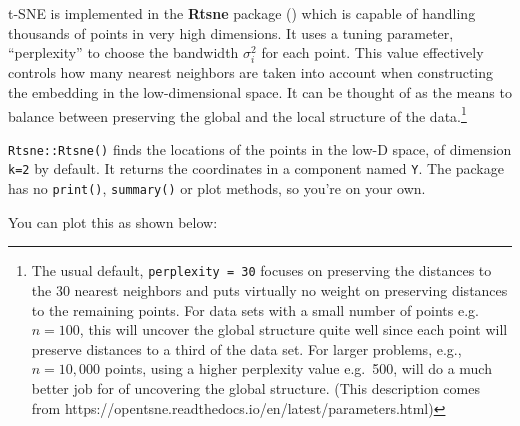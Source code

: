 \documentclass[
  letterpaper,
  10pt,
  krantz2]{krantz}
\makeatletter
\newenvironment{Shaded}{\begin{snugshade}}{\end{snugshade}}
\newcommand{\AttributeTok}[1]{\textcolor[rgb]{0.40,0.45,0.13}{#1}}
\newcommand{\ConstantTok}[1]{\textcolor[rgb]{0.56,0.35,0.01}{#1}}
\newcommand{\DecValTok}[1]{\textcolor[rgb]{0.68,0.00,0.00}{#1}}
\newcommand{\FunctionTok}[1]{\textcolor[rgb]{0.28,0.35,0.67}{#1}}
\newcommand{\NormalTok}[1]{\textcolor[rgb]{0.00,0.23,0.31}{#1}}
\newcommand{\OtherTok}[1]{\textcolor[rgb]{0.00,0.23,0.31}{#1}}
\newcommand{\SpecialCharTok}[1]{\textcolor[rgb]{0.37,0.37,0.37}{#1}}
\newcommand{\StringTok}[1]{\textcolor[rgb]{0.13,0.47,0.30}{#1}}
\newenvironment{kframe}{%
  \medskip{}
  \setlength{\fboxsep}{.8em}
  \def\at@end@of@kframe{}%
  \ifinner\ifhmode%
  \def\at@end@of@kframe{\end{minipage}}%
  \begin{minipage}{\columnwidth}%
  \fi\fi%
  \def\FrameCommand##1{\hskip\@totalleftmargin \hskip-\fboxsep
  \colorbox{shadecolor}{##1}\hskip-\fboxsep
      \hskip-\linewidth \hskip-\@totalleftmargin \hskip\columnwidth}%
  \MakeFramed {\advance\hsize-\width
    \@totalleftmargin\z@ \linewidth\hsize
    \@setminipage}}%
{\par\unskip\endMakeFramed%
  \at@end@of@kframe}
\renewenvironment{Shaded}{\begin{kframe}}{\end{kframe}}
\makeatother
\begin{document}
t-SNE is implemented in the \textbf{Rtsne} package
() which is capable of handling
thousands of points in very high dimensions. It uses a tuning parameter,
``perplexity'' to choose the bandwidth \(\sigma^2_i\) for each point.
This value effectively controls how many nearest neighbors are taken
into account when constructing the embedding in the low-dimensional
space. It can be thought of as the means to balance between preserving
the global and the local structure of the data.\footnote{The usual
  default, \texttt{perplexity\ =\ 30} focuses on preserving the
  distances to the 30 nearest neighbors and puts virtually no weight on
  preserving distances to the remaining points. For data sets with a
  small number of points e.g.~\(n=100\), this will uncover the global
  structure quite well since each point will preserve distances to a
  third of the data set. For larger problems, e.g., \(n = 10,000\)
  points, using a higher perplexity value e.g.~500, will do a much
  better job for of uncovering the global structure. (This description
  comes from https://opentsne.readthedocs.io/en/latest/parameters.html)}

\texttt{Rtsne::Rtsne()} finds the locations of the points in the low-D
space, of dimension \texttt{k=2} by default. It returns the coordinates
in a component named \texttt{Y}. The package has no \texttt{print()},
\texttt{summary()} or plot methods, so you're on your own.

\begin{Shaded}
\end{Shaded}

You can plot this as shown below:
\end{document}
